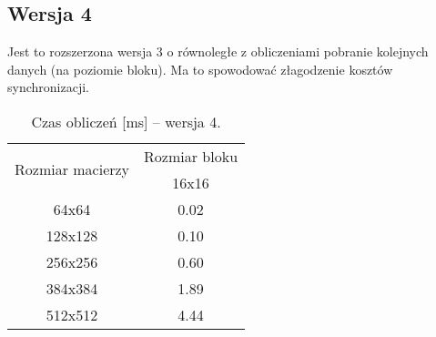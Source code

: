 
\subsection{Wersja 4}

Jest to rozszerzona wersja 3 o równoległe z obliczeniami pobranie kolejnych danych (na poziomie bloku). Ma to spowodować złagodzenie kosztów synchronizacji.



\begin{table}[H]
\centering
\begin{tabular}{|c|c|}
\hline
\multirow{2}{*}{Rozmiar macierzy} & \multicolumn{1}{c|}{Rozmiar bloku} \\ \cline{2-2}
& 16x16 \\ \hline
64x64 & 0.02 \\ \hline
128x128 & 0.10 \\ \hline
256x256 & 0.60 \\ \hline
384x384 & 1.89 \\ \hline
512x512 & 4.44 \\ \hline
\end{tabular}
\caption{Czas obliczeń [ms] -- wersja 4.}
\end{table}
